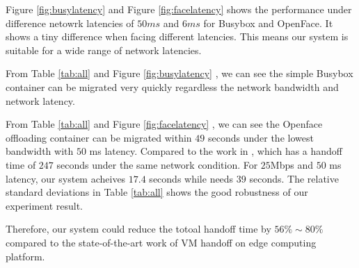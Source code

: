 
Figure \ref{fig:busylatency}
and
Figure \ref{fig:facelatency} shows the performance under difference netowrk latencies of $50ms$ and $6ms$ for Busybox and OpenFace.  It shows a tiny difference when facing different latencies. This means our system is suitable for a wide range of network latencies.


From Table \ref{tab:all} and Figure \ref{fig:busylatency} , we can see the simple Busybox container can be migrated very quickly regardless the network bandwidth and network latency. 

From Table \ref{tab:all} and Figure \ref{fig:facelatency} , we can see the Openface offloading container can be migrated within $49$ seconds under the lowest bandwidth with $50$ ms latency. Compared to the work in \cite{ha2015vmhandoff}, which has a handoff time of $247$ seconds under the same network condition. For $25$Mbps and $50$ ms latency, our system acheives $17.4$ seconds while  \cite{ha2015vmhandoff}  needs $39$ seconds. The relative standard deviations in Table \ref{tab:all} shows the good robustness of our experiment result.


Therefore, our system could reduce the totoal handoff time by $56\%\sim 80\%$ compared to the state-of-the-art work of VM handoff \cite{ha2015vmhandoff} on edge computing platform. 














